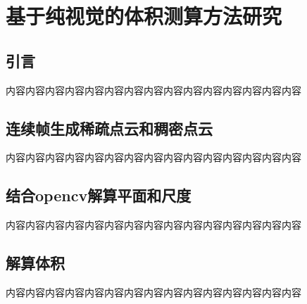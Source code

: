 \chapter{基于纯视觉的体积测算方法研究}
\label{cha:chap4}
\section{引言}
\label{sec:4.1}
内容内容内容内容内容内容内容内容内容内容内容内容内容内容内容
\section{连续帧生成稀疏点云和稠密点云}
\label{sec:4.2}
内容内容内容内容内容内容内容内容内容内容内容内容内容内容内容
\section{结合opencv解算平面和尺度}
\label{sec:4.3}
内容内容内容内容内容内容内容内容内容内容内容内容内容内容内容
\section{解算体积}
\label{sec:4.4}
内容内容内容内容内容内容内容内容内容内容内容内容内容内容内容

